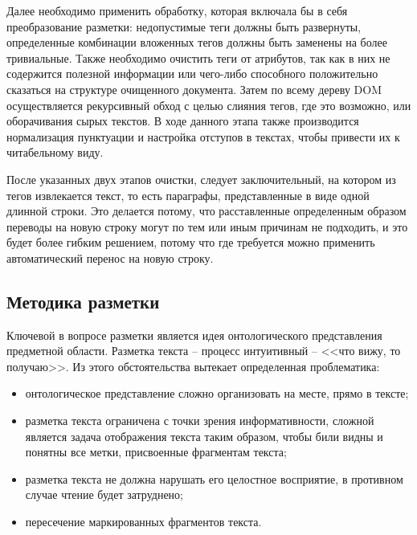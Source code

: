 \documentclass[../main]{subfiles}
\begin{document}
Далее необходимо применить обработку, которая включала бы в себя преобразование разметки: недопустимые теги должны быть развернуты, определенные комбинации вложенных тегов должны быть заменены на более тривиальные. Также необходимо очистить теги от атрибутов, так как в них не содержится полезной информации или чего-либо способного положительно сказаться на структуре очищенного документа. Затем по всему дереву DOM осуществляется рекурсивный обход с целью слияния тегов, где это возможно, или оборачивания сырых текстов. В ходе данного этапа также производится нормализация пунктуации и настройка отступов в текстах, чтобы привести их к читабельному виду. 

После указанных двух этапов очистки, следует заключительный, на котором из тегов извлекается текст, то есть параграфы, представленные в виде одной длинной строки. Это делается потому, что расставленные определенным образом переводы на новую строку могут по тем или иным причинам не подходить, и это будет более гибким решением, потому что где требуется можно применить автоматический перенос на новую строку.

\subsection{Методика разметки}
Ключевой в вопросе разметки является идея онтологического представления предметной области. Разметка текста -- процесс интуитивный -- <<что вижу, то получаю>>. Из этого обстоятельства вытекает определенная проблематика:
\begin{itemize}
    \item онтологическое представление сложно организовать на месте, прямо в тексте;
    \item разметка текста ограничена с точки зрения информативности, сложной является задача отображения текста таким образом, чтобы били видны и понятны все метки, присвоенные фрагментам текста;
    \item разметка текста не должна нарушать его целостное восприятие, в противном случае чтение будет затруднено;
    \item пересечение маркированных фрагментов текста.
\end{itemize}
\end{document}
